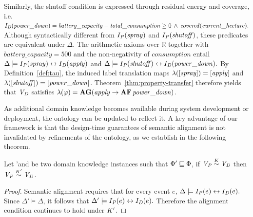 \begin{example}
Similarly, the shutoff condition is expressed through residual energy and coverage, i.e.  $I_{\mathit{D}}(\mathit{power\_down}) = \mathit{battery\_capacity} - \mathit{total\_consumption} \geq 0
    \,\wedge\, \mathit{covered}(\mathit{current\_hectare}).$
%
Although syntactically different from $I_{\mathit{P}}(\mathit{spray})$ and
$I_{\mathit{P}}(\mathit{shutoff})$, these predicates are equivalent under
$\Delta$. The arithmetic axioms over $\mathbb{R}$ together with
$\mathit{battery\_capacity} = 500$ and the non-negativity of
$\mathit{consumption}$ entail $ \Delta \models
  I_{\mathit{P}}(\mathit{spray}) \leftrightarrow I_{\mathit{D}}(\mathit{apply})$ and $  \Delta \models
  I_{\mathit{P}}(\mathit{shutoff}) \leftrightarrow I_{\mathit{D}}(\mathit{power\_down}).$
By Definition~\ref{def:tau}, the induced label translation maps
$\lambda([\mathit{spray}]) = [\mathit{apply}]$ and
$\lambda([\mathit{shutoff}]) = [\mathit{power\_down}]$.
Theorem~\ref{thm:property-transfer} therefore yields that $\mathit{V_D}$
satisfies $\lambda(\varphi) =
\mathbf{AG}(\mathit{apply} \rightarrow \mathbf{AF}\,\mathit{power\_down})$.
\end{example}

As additional domain knowledge becomes available during system development or deployment, the ontology can be updated to reflect it. A key advantage of our framework is that the design-time guarantees of semantic alignment is not invalidated by refinements of the ontology, as we establish in the following theorem. 



\begin{theorem}
\label{thm:alignment-refinement}
Let \DomainKnowledge'and \DomainKnowledge be two domain knowledge instances such that $\Phi'\sqsubseteq\Phi$,  if $\mathit{V_P}\stackrel{K}{\sim}\mathit{V_D}$ then $\mathit{V_P}\stackrel{K'}{\sim}\mathit{V_D}$. 
\end{theorem}

\begin{proof}
Semantic alignment requires that for every event $e$,
$\Delta \models I_{\mathit{P}}(e) \leftrightarrow I_{\mathit{D}}(e).$
Since $\Delta' \models \Delta$, it follows that $\Delta' \models  I_{\mathit{P}}(e) \leftrightarrow I_{\mathit{D}}(e).$ Therefore the alignment condition continues to hold under $K'$.
\end{proof}

